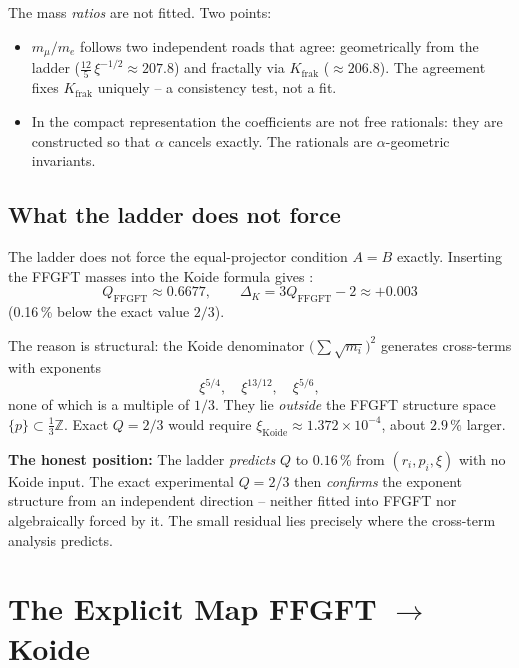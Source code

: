 The mass \emph{ratios} are not fitted. Two points:
\begin{itemize}
  \item \(m_\mu/m_e\) follows two independent roads that agree:
        geometrically from the ladder
        (\(\tfrac{12}{5}\,\xi^{-1/2} \approx 207.8\))
        and fractally via \(K_{\text{frak}}\) (\(\approx 206.8\)).
        The agreement fixes \(K_{\text{frak}}\) uniquely --
        a consistency test, not a fit.
  \item In the compact representation the coefficients are not free
        rationals: they are constructed so that \(\alpha\) cancels
        exactly. The rationals are \(\alpha\)-geometric invariants.
\end{itemize}

\subsection*{What the ladder does not force}

The ladder does not force the equal-projector condition \(A = B\) exactly.
Inserting the FFGFT masses into the Koide formula gives \cite{PascherDok192}:
\begin{equation}
  Q_{\text{FFGFT}} \approx 0.6677,
  \qquad
  \Delta_K = 3Q_{\text{FFGFT}} - 2 \approx +0.003
\end{equation}
(0.16\,\% below the exact value \(2/3\)).

The reason is structural: the Koide denominator
\(\bigl(\sum\sqrt{m_i}\bigr)^2\) generates cross-terms with exponents
\begin{equation}
  \xi^{5/4}, \quad \xi^{13/12}, \quad \xi^{5/6},
\end{equation}
none of which is a multiple of \(1/3\). They lie \emph{outside} the FFGFT
structure space \(\{p\} \subset \tfrac{1}{3}\mathbb{Z}\).
Exact \(Q = 2/3\) would require
\(\xi_{\text{Koide}} \approx 1.372\times10^{-4}\), about \(2.9\,\%\) larger.

\textbf{The honest position:}
The ladder \emph{predicts} \(Q\) to \(0.16\,\%\) from
\((r_i, p_i, \xi)\) with no Koide input.
The exact experimental \(Q = 2/3\) then \emph{confirms} the exponent
structure from an independent direction -- neither fitted into FFGFT nor
algebraically forced by it. The small residual lies precisely where the
cross-term analysis predicts.

\section{The Explicit Map FFGFT \texorpdfstring{\(\to\)}{→} Koide}

